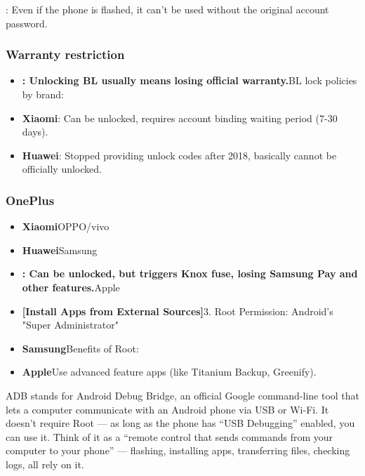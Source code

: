
: Even if the phone is flashed, it can't be used without the original account password.

\subsubsection*{Warranty restriction}

\begin{itemize}
  \item \textbf{: Unlocking BL usually means losing official warranty.}BL lock policies by brand:
  \item \textbf{Xiaomi}: Can be unlocked, requires account binding waiting period (7-30 days).
  \item \textbf{Huawei}: Stopped providing unlock codes after 2018, basically cannot be officially unlocked.
\end{itemize}

\subsubsection*{OnePlus}

\begin{itemize}
  \item \textbf{Xiaomi}OPPO/vivo
  \item \textbf{Huawei}Samsung
  \item \textbf{: Can be unlocked, but triggers Knox fuse, losing Samsung Pay and other features.}Apple
  \item \textbf{[Install Apps from External Sources]}3. Root Permission: Android's "Super Administrator"
  \item \textbf{Samsung}Benefits of Root:
  \item \textbf{Apple}Use advanced feature apps (like Titanium Backup, Greenify).
\end{itemize}


ADB stands for Android Debug Bridge, an official Google command-line tool that lets a computer communicate with an Android phone via USB or Wi-Fi. It doesn't require Root — as long as the phone has “USB Debugging” enabled, you can use it. Think of it as a “remote control that sends commands from your computer to your phone” — flashing, installing apps, transferring files, checking logs, all rely on it.

